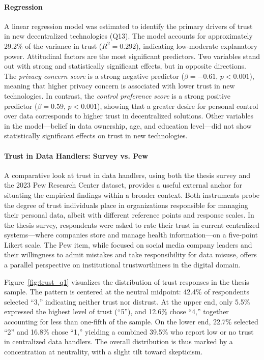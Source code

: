 		\paragraph{Regression}
		A linear regression model was estimated to identify the primary drivers of trust in new decentralized technologies (Q13). The model accounts for approximately 29.2\% of the variance in trust ($R^2 = 0.292$), indicating low-moderate explanatory power. Attitudinal factors are the most significant predictors.
		Two variables stand out with strong and statistically significant effects, but in opposite directions. The \textit{privacy concern score} is a strong negative predictor ($\beta = -0.61$, $p < 0.001$), meaning that higher privacy concern is associated with lower trust in new technologies. In contrast, the \textit{control preference score} is a strong positive predictor ($\beta = 0.59$, $p < 0.001$), showing that a greater desire for personal control over data corresponds to higher trust in decentralized solutions.
		Other variables in the model---belief in data ownership, age, and education level---did not show statistically significant effects on trust in new technologies.

		\paragraph{Trust in Data Handlers: Survey vs. Pew}
		A comparative look at trust in data handlers, using both the thesis survey and the 2023 Pew Research Center dataset, provides a useful external anchor for situating the empirical findings within a broader context. Both instruments probe the degree of trust individuals place in organizations responsible for managing their personal data, albeit with different reference points and response scales. In the thesis survey, respondents were asked to rate their trust in current centralized systems—where companies store and manage health information—on a five-point Likert scale. The Pew item, while focused on social media company leaders and their willingness to admit mistakes and take responsibility for data misuse, offers a parallel perspective on institutional trustworthiness in the digital domain.
		
		Figure~\ref{fig:trust_q1} visualizes the distribution of trust responses in the thesis sample. The pattern is centered at the neutral midpoint: 42.4\% of respondents selected “3,” indicating neither trust nor distrust. At the upper end, only 5.5\% expressed the highest level of trust (“5”), and 12.6\% chose “4,” together accounting for less than one-fifth of the sample. On the lower end, 22.7\% selected “2” and 16.8\% chose “1,” yielding a combined 39.5\% who report low or no trust in centralized data handlers. The overall distribution is thus marked by a concentration at neutrality, with a slight tilt toward skepticism.
		
